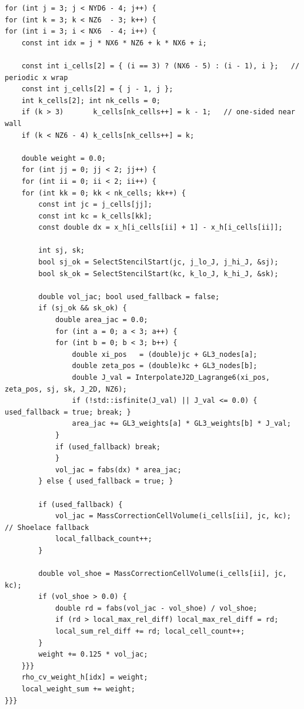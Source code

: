 \documentclass[11pt]{article}
\theoremstyle{definition}
\theoremstyle{remark}
\begin{document}
\begin{lstlisting}[caption={Median-dual assembly with GL-3 cells and Shoelace fallback (\texttt{evolution.h}:233--362, excerpt).}]
for (int j = 3; j < NYD6 - 4; j++) {
for (int k = 3; k < NZ6  - 3; k++) {
for (int i = 3; i < NX6  - 4; i++) {
    const int idx = j * NX6 * NZ6 + k * NX6 + i;

    const int i_cells[2] = { (i == 3) ? (NX6 - 5) : (i - 1), i };   // periodic x wrap
    const int j_cells[2] = { j - 1, j };
    int k_cells[2]; int nk_cells = 0;
    if (k > 3)       k_cells[nk_cells++] = k - 1;   // one-sided near wall
    if (k < NZ6 - 4) k_cells[nk_cells++] = k;

    double weight = 0.0;
    for (int jj = 0; jj < 2; jj++) {
    for (int ii = 0; ii < 2; ii++) {
    for (int kk = 0; kk < nk_cells; kk++) {
        const int jc = j_cells[jj];
        const int kc = k_cells[kk];
        const double dx = x_h[i_cells[ii] + 1] - x_h[i_cells[ii]];

        int sj, sk;
        bool sj_ok = SelectStencilStart(jc, j_lo_J, j_hi_J, &sj);
        bool sk_ok = SelectStencilStart(kc, k_lo_J, k_hi_J, &sk);

        double vol_jac; bool used_fallback = false;
        if (sj_ok && sk_ok) {
            double area_jac = 0.0;
            for (int a = 0; a < 3; a++) {
            for (int b = 0; b < 3; b++) {
                double xi_pos   = (double)jc + GL3_nodes[a];
                double zeta_pos = (double)kc + GL3_nodes[b];
                double J_val = InterpolateJ2D_Lagrange6(xi_pos, zeta_pos, sj, sk, J_2D, NZ6);
                if (!std::isfinite(J_val) || J_val <= 0.0) { used_fallback = true; break; }
                area_jac += GL3_weights[a] * GL3_weights[b] * J_val;
            }
            if (used_fallback) break;
            }
            vol_jac = fabs(dx) * area_jac;
        } else { used_fallback = true; }

        if (used_fallback) {
            vol_jac = MassCorrectionCellVolume(i_cells[ii], jc, kc);   // Shoelace fallback
            local_fallback_count++;
        }

        double vol_shoe = MassCorrectionCellVolume(i_cells[ii], jc, kc);
        if (vol_shoe > 0.0) {
            double rd = fabs(vol_jac - vol_shoe) / vol_shoe;
            if (rd > local_max_rel_diff) local_max_rel_diff = rd;
            local_sum_rel_diff += rd; local_cell_count++;
        }
        weight += 0.125 * vol_jac;
    }}}
    rho_cv_weight_h[idx] = weight;
    local_weight_sum += weight;
}}}
\end{lstlisting}
\end{document}
